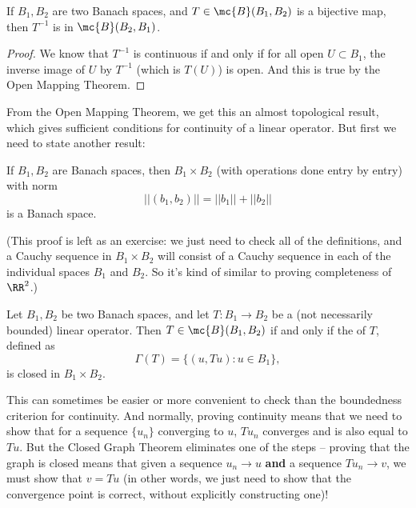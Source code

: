\begin{corollary}\label{bijectivebounded}
If $B_1, B_2$ are two Banach spaces, and $T \in \mc{B}(B_1, B_2)$ is a bijective map, then $T^{-1}$ is in $\mc{B}(B_2, B_1)$.
\end{corollary}
\begin{proof}
We know that $T^{-1}$ is continuous if and only if for all open $U \subset B_1$, the inverse image of $U$ by $T^{-1}$ (which is $T(U)$) is open. And this is true by the Open Mapping Theorem.
\end{proof}

From the Open Mapping Theorem, we get this an almost topological result, which gives sufficient conditions for continuity of a linear operator. But first we need to state another result:

\begin{proposition}
If $B_1, B_2$ are Banach spaces, then $B_1 \times B_2$ (with operations done entry by entry) with norm 
\[
    ||(b_1, b_2)|| = ||b_1|| + ||b_2||
\]  
is a Banach space.
\end{proposition}

(This proof is left as an exercise: we just need to check all of the definitions, and a Cauchy sequence in $B_1 \times B_2$ will consist of a Cauchy sequence in each of the individual spaces $B_1$ and $B_2$. So it's kind of similar to proving completeness of $\RR^2$.)

\begin{theorem}
Let $B_1, B_2$ be two Banach spaces, and let $T: B_1 \to B_2$ be a (not necessarily bounded) linear operator. Then $T \in \mc{B}(B_1, B_2)$ if and only if the  of $T$, defined as 
\[
    \Gamma(T) = \{(u, Tu): u \in B_1\},
\]
is closed in $B_1 \times B_2$.
\end{theorem}

This can sometimes be easier or more convenient to check than the boundedness criterion for continuity. And normally, proving continuity means that we need to show that for a sequence $\{u_n\}$ converging to $u$, $Tu_n$ converges and is also equal to $Tu$. But the Closed Graph Theorem eliminates one of the steps -- proving that the graph is closed means that given a sequence $u_n \to u$ \textbf{and} a sequence $Tu_n \to v$, we must show that $v = Tu$ (in other words, we just need to show that the convergence point is correct, without explicitly constructing one)!

